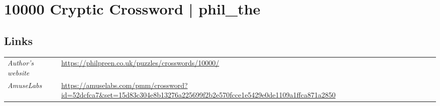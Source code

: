 \section[10000 Cryptic Crossword | phil\_the {[\emph{Cryptic Crossword}]}]{10000 Cryptic Crossword | {\normalfont phil\_the}}
\label{sec:16-10000-cryptic-crossword-phil-the}

\subsection*{Links}
\begin{tabularx}{\textwidth}{l X}
\emph{Author's website} & \url{https://philpreen.co.uk/puzzles/crosswords/10000/} \\
\emph{AmuseLabs} & \url{https://amuselabs.com/pmm/crossword?id=52dcfca7&set=15d83c304e8b13276a225699f2b2e570fcce1e5429e0de1109a1ffca871a2850} \\
\end{tabularx}
\pagebreak
